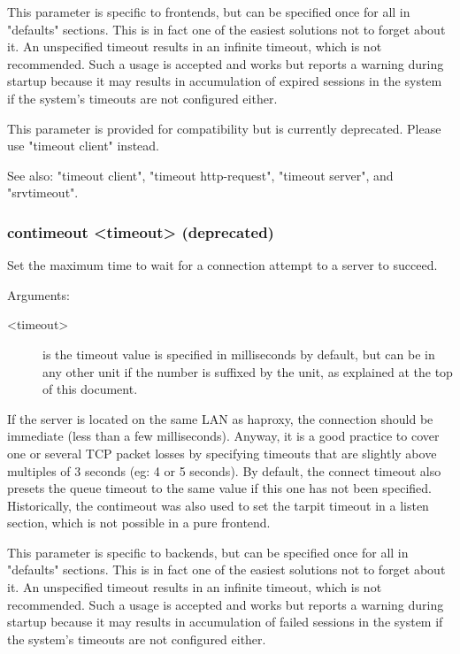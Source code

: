   This parameter is specific to frontends, but can be specified once for all in
  "defaults" sections. This is in fact one of the easiest solutions not to
  forget about it. An unspecified timeout results in an infinite timeout, which
  is not recommended. Such a usage is accepted and works but reports a warning
  during startup because it may results in accumulation of expired sessions in
  the system if the system's timeouts are not configured either.

  This parameter is provided for compatibility but is currently deprecated.
  Please use "timeout client" instead.

  See also: "timeout client", "timeout http-request", "timeout server", and
             "srvtimeout".

\subsubsection[contimeout]{contimeout <timeout> (deprecated)}
  Set the maximum time to wait for a connection attempt to a server to succeed.

  Arguments:
  \begin{description}
  \item[<timeout>] is the timeout value is specified in milliseconds by default, but
              can be in any other unit if the number is suffixed by the unit,
              as explained at the top of this document.  
  \end{description}

  If the server is located on the same LAN as haproxy, the connection should be
  immediate (less than a few milliseconds). Anyway, it is a good practice to
  cover one or several TCP packet losses by specifying timeouts that are
  slightly above multiples of 3 seconds (eg: 4 or 5 seconds). By default, the
  connect timeout also presets the queue timeout to the same value if this one
  has not been specified. Historically, the contimeout was also used to set the
  tarpit timeout in a listen section, which is not possible in a pure frontend.

  This parameter is specific to backends, but can be specified once for all in
  "defaults" sections. This is in fact one of the easiest solutions not to
  forget about it. An unspecified timeout results in an infinite timeout, which
  is not recommended. Such a usage is accepted and works but reports a warning
  during startup because it may results in accumulation of failed sessions in
  the system if the system's timeouts are not configured either.

